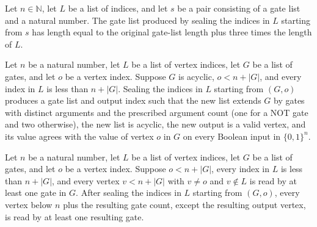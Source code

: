 \begin{theorem}
\label{BoolCircuit.sealGates_length}
\leanok
{}
Let $n\in\mathbb{N}$, let $L$ be a list of indices, and let $s$ be a pair consisting of
a gate list and a natural number. The gate list produced by sealing the indices in $L$
starting from $s$ has length equal to the original gate-list length plus three times the
length of $L$.
\end{theorem}

\begin{theorem}
\label{BoolCircuit.sealGates_spec}
\leanok
{}
Let $n$ be a natural number, let $L$ be a list of vertex indices, let $G$ be a list of
gates, and let $o$ be a vertex index. Suppose $G$ is acyclic, $o<n+|G|$, and every index
in $L$ is less than $n+|G|$. Sealing the indices in $L$ starting from $(G,o)$ produces a
gate list and output index such that the new list extends $G$ by gates with distinct
arguments and the prescribed argument count (one for a NOT gate and two otherwise), the
new list is acyclic, the new output is a valid vertex, and its value agrees with the
value of vertex $o$ in $G$ on every Boolean input in $\{0,1\}^n$.
\end{theorem}

\begin{theorem}
\label{BoolCircuit.sealGates_read}
\leanok
{}
Let $n$ be a natural number, let $L$ be a list of vertex indices, let $G$ be a list of
gates, and let $o$ be a vertex index. Suppose $o<n+|G|$, every index in $L$ is less than
$n+|G|$, and every vertex $v<n+|G|$ with $v\ne o$ and $v\notin L$ is read by at least
one gate in $G$. After sealing the indices in $L$ starting from $(G,o)$, every vertex
below $n$ plus the resulting gate count, except the resulting output vertex, is read by
at least one resulting gate.
\end{theorem}

